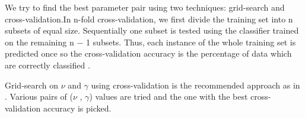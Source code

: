 We try to find the best parameter pair using two techniques: grid-search and cross-validation.In n-fold cross-validation, we first divide the training set into n subsets of equal size. Sequentially one subset is tested using the classifier trained on the remaining n − 1 subsets. Thus, each instance of the whole training set is predicted once so the cross-validation accuracy is the percentage of data which are correctly classified \cite{hsu2003practical}.

Grid-search on $\nu$ and $\gamma$ using cross-validation is the recommended approach as in \cite{hsu2003practical}. Various pairs of ($\nu$ , $\gamma$) values are tried and the one with the best cross-validation accuracy is
picked. 



